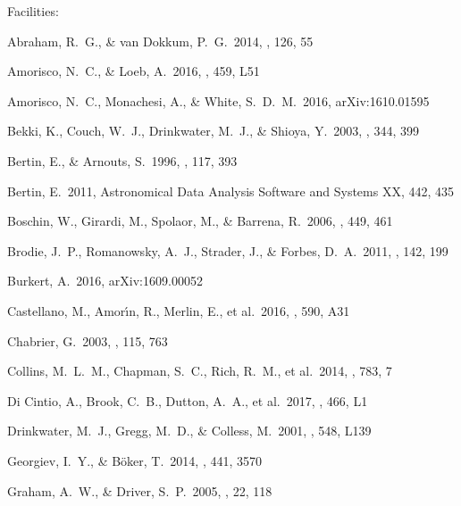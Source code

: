 \documentclass[iop,tighten,twocolumn,apj]{emulateapj}
\begin{document}
Facilities: 



\begin{thebibliography}{}

 Abraham, R.~G., \&
van Dokkum, P.~G.\ 2014, \pasp, 126, 55 

 Amorisco, N.~C., \&
Loeb, A.\ 2016, \mnras, 459, L51

 Amorisco, N.~C.,
Monachesi, A., \& White, S.~D.~M.\ 2016, arXiv:1610.01595

 Bekki, K., Couch, W.~J.,
Drinkwater, M.~J., \& Shioya, Y.\ 2003, \mnras, 344, 399

 Bertin, E., \& Arnouts, S.\
1996, \aaps, 117, 393 

 Bertin, E.\ 2011, Astronomical
Data Analysis Software and Systems XX, 442, 435

 Boschin, W., Girardi, M., Spolaor,
M., \& Barrena, R.\ 2006, \aap, 449, 461

 Brodie, J.~P., Romanowsky,
A.~J., Strader, J., \& Forbes, D.~A.\ 2011, \aj, 142, 199 

 Burkert, A.\ 2016, arXiv:1609.00052

 Castellano, M.,
Amor{\'{\i}}n, R., Merlin, E., et al.\ 2016, \aap, 590, A31 

 Chabrier, G.\ 2003, \pasp, 115,
763

 Collins, M.~L.~M.,
Chapman, S.~C., Rich, R.~M., et al.\ 2014, \apj, 783, 7

 Di Cintio, A., Brook,
C.~B., Dutton, A.~A., et al.\ 2017, \mnras, 466, L1

 Drinkwater, M.~J., Gregg,
M.~D., \& Colless, M.\ 2001, \apjl, 548, L139

 Georgiev, I.~Y., \&
B{\"o}ker, T.\ 2014, \mnras, 441, 3570

 Graham, A.~W., \&
Driver, S.~P.\ 2005, \pasa, 22, 118


\end{thebibliography}
\end{document}
